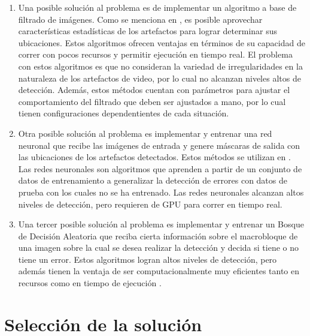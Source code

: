 \begin{enumerate}
    \item Una posible solución al problema es de implementar un algoritmo a base de filtrado de imágenes. Como se menciona en \cite{Vranjes2018, Glavota2018}, es posible aprovechar características estadísticas de los artefactos para lograr determinar sus ubicaciones. Estos algoritmos ofrecen ventajas en términos de su capacidad de correr con pocos recursos y permitir ejecución en tiempo real. El problema con estos algoritmos es que no consideran la variedad de irregularidades en la naturaleza de los artefactos de video, por lo cual no alcanzan niveles altos de detección. Además, estos métodos cuentan con parámetros para ajustar el comportamiento del filtrado que deben ser ajustados a mano, por lo cual tienen configuraciones dependentientes de cada situación.

    \item Otra posible solución al problema es implementar y entrenar una red neuronal que recibe las imágenes de entrada y genere máscaras de salida con las ubicaciones de los artefactos detectados. Estos métodos se utilizan en \cite{Goodall2019,Rajasekar2020}. Las redes neuronales son algoritmos que aprenden a partir de un conjunto de datos de entrenamiento a generalizar la detección de errores con datos de prueba con los cuales no se ha entrenado. Las redes neuronales alcanzan altos niveles de detección, pero requieren de GPU para correr en tiempo real.

    \item Una tercer posible solución al problema es implementar y entrenar un Bosque de Decisión Aleatoria que reciba cierta información sobre el macrobloque de una imagen sobre la cual se desea realizar la detección y decida si tiene o no tiene un error. Estos algoritmos logran altos niveles de detección, pero además tienen la ventaja de ser computacionalmente muy eficientes tanto en recursos como en tiempo de ejecución \cite{Keskin2012}.
\end{enumerate}

\section{Selección de la solución}

